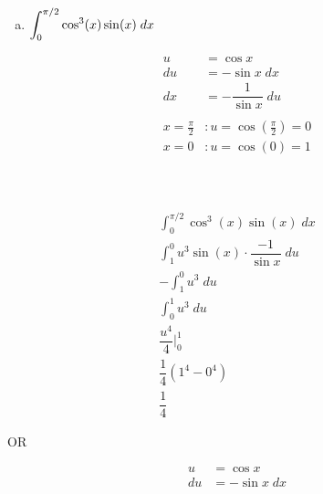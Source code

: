 \documentclass[12pt,letterpaper]{exam}
\begin{document}
\begin{questions}
\begin{enumerate}[(a)]
	\item $\displaystyle\int_0^{\pi/2} \cos^3(x) \sin(x) \;dx$ \pvspace{1cm}
	
	\end{enumerate}
	
	\hspace{-2.5cm} \begin{minipage}[b]{0.25\textwidth}
			\[
			\begin{aligned}
			u&= \cos x \\[0.2cm]
			du&= -\sin x \;dx \\[0.1cm]
			dx&= -\dfrac{1}{\sin x} \;du \\
			\\
			x= \frac{\pi}{2} &\colon u= \cos(\frac{\pi}{2})= 0 \\[0.2cm]
			x= 0 &\colon u= \cos(0)= 1 \\ \\ \\ \\ \\ \\ \\
			\end{aligned}
			\]
		\end{minipage} \begin{minipage}[b]{0.23\textwidth}
			\[
			\begin{gathered}
			\int_0^{\pi/2} \cos^3(x) \sin(x) \;dx \\[0.1cm]
			\int_1^0 u^3 \sin(x) \cdot \dfrac{-1}{\sin x} \;du \\[0.1cm]
			-\int_1^0 u^3 \;du \\[0.1cm]
			\int_0^1 u^3 \;du \\[0.1cm]
			\dfrac{u^4}{4} \bigg|_0^1 \\[0.1cm]
			\dfrac{1}{4} \left(1^4 - 0^4 \right) \\[0.1cm]
			\dfrac{1}{4}
			\end{gathered}
			\]
		\end{minipage} \hspace{0.2cm} \begin{minipage}[b]{0.05\textwidth}
		\pvspace{3cm} OR
		\end{minipage} \hspace{0.5cm} \begin{minipage}[b]{0.28\textwidth}
			\[
			\begin{aligned}
			u&= \cos x \\[0.2cm]
			du&= -\sin x \;dx \\
			\\

\end{aligned}\]
\end{minipage}
\end{questions}
\end{document}
